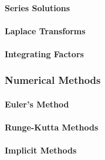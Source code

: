 
\paragraph{Series Solutions}

\paragraph{Laplace Transforms}

\paragraph{Integrating Factors}










\subsubsection{Numerical Methods}

\paragraph{Euler's Method}

\paragraph{Runge-Kutta Methods}

\paragraph{Implicit Methods}


